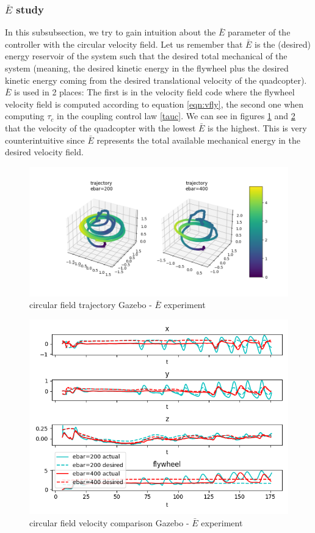\subsubsection{$\bar{E}$ study}
In this subsubsection, we try to gain intuition about the $\bar{E}$ parameter of the controller with the circular velocity field.
Let us remember that $\bar{E}$ is the (desired) energy reservoir of the system such that the desired total mechanical of the system (meaning, the desired kinetic energy in the flywheel plus the desired kinetic energy coming from the desired translational velocity of the quadcopter).
$\bar{E}$ is used in 2 places: The first is in the velocity field code where the flywheel velocity field is computed according to equation \ref{eqn:vfly}, the second one when computing $\tau_c$ in the coupling control law \ref{tauc}.
We can see in figures \ref{fig:trajgazebocircularebar} and \ref{fig:velgazebocircularebar} that the velocity of the quadcopter with the lowest $\bar{E}$ is the highest.
This is very counterintuitive since $\bar{E}$ represents the total available mechanical energy in the desired velocity field.
\begin{figure}[h!]
   \centering
   \includegraphics[width=\linewidth]{Images/gazebo_trajectory_ebar_circular.png}
   \caption{circular field trajectory Gazebo - $\bar{E}$ experiment}
   \label{fig:trajgazebocircularebar}
\end{figure}
\begin{figure}[h!]
   \centering
   \includegraphics[width=\linewidth]{Images/gazebo_circular_ebar_V.png}
   \caption{circular field velocity comparison Gazebo - $\bar{E}$ experiment}
   \label{fig:velgazebocircularebar}
\end{figure}
